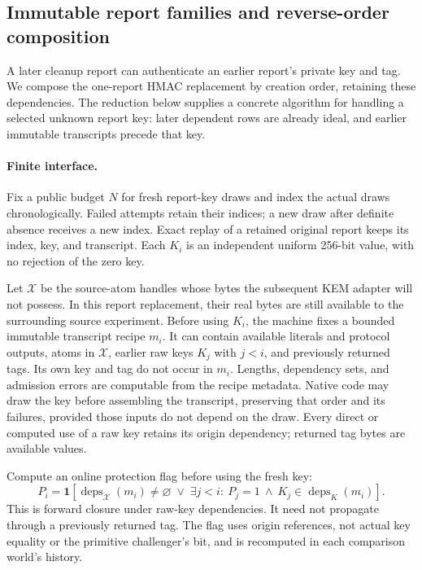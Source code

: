 \subsection{Immutable report families and reverse-order composition}
\label{sec:report-composition}

A later cleanup report can authenticate an earlier report's private key and
tag.  We compose the one-report HMAC replacement by creation order, retaining
these dependencies.  The reduction below supplies a concrete algorithm for
handling a selected unknown report key: later dependent rows are already ideal,
and earlier immutable transcripts precede that key.

\paragraph{Finite interface.}
Fix a public budget $N$ for fresh report-key draws and index the actual draws
chronologically.  Failed attempts retain their indices; a new draw after
definite absence receives a new index.  Exact replay of a retained original
report keeps its index, key, and transcript.  Each $K_i$ is an independent
uniform 256-bit value, with no rejection of the zero key.

Let $\mathcal X$ be the source-atom handles whose bytes the subsequent KEM
adapter will not possess.  In this report replacement, their real bytes are
still available to the surrounding source experiment.  Before using $K_i$, the
machine fixes a bounded immutable transcript recipe $m_i$.  It can contain
available literals and protocol outputs, atoms in $\mathcal X$, earlier raw
keys $K_j$ with $j<i$, and previously returned tags.  Its own key and tag do not
occur in $m_i$.  Lengths, dependency sets, and admission errors are computable
from the recipe metadata.  Native code may draw the key before assembling the
transcript, preserving that order and its failures, provided those inputs do
not depend on the draw.  Every direct or computed use of a raw key retains its
origin dependency; returned tag bytes are available values.

Compute an online protection flag before using the fresh key:
\begin{equation}
 P_i=\mathbf 1\!\left[
 \operatorname{deps}_{\mathcal X}(m_i)\ne\varnothing
 \;\lor\;
 \exists j<i:\ P_j=1\ \land\ K_j\in\operatorname{deps}_{K}(m_i)
 \right].
 \label{eq:report-protection}
\end{equation}
This is forward closure under raw-key dependencies.  It need not propagate
through a previously returned tag.  The flag uses origin references, not
actual key equality or the primitive challenger's bit, and is recomputed in
each comparison world's history.

